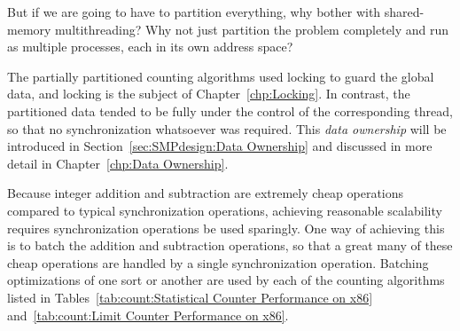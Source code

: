\QuickQuiz{}
	But if we are going to have to partition everything, why bother
	with shared-memory multithreading?
	Why not just partition the problem completely and run as
	multiple processes, each in its own address space?
 \QuickQuizEnd

The partially partitioned counting algorithms used locking to
guard the global data, and locking is the subject of
Chapter~\ref{chp:Locking}.
In contrast, the partitioned data tended to be fully under the control of
the corresponding thread, so that no synchronization whatsoever was required.
This \emph{data ownership} will be introduced in
Section~\ref{sec:SMPdesign:Data Ownership}
and discussed in more detail in
Chapter~\ref{chp:Data Ownership}.

Because integer addition and subtraction are extremely cheap operations
compared to typical synchronization operations, achieving reasonable
scalability requires synchronization operations be used sparingly.
One way of achieving this is to batch the addition and subtraction
operations, so that a great many of these cheap operations are handled
by a single synchronization operation.
Batching optimizations of one sort or another are used by each of
the counting algorithms listed in
Tables~\ref{tab:count:Statistical Counter Performance on x86}
and~\ref{tab:count:Limit Counter Performance on x86}.


